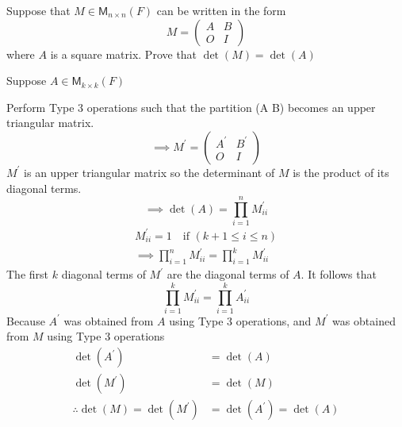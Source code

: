 Suppose that $M \in \mathsf{M}_{n\times n}(F)$ can be written in the
form 
\[
M = \begin{pmatrix} A & B\\O & I
\end{pmatrix}
\]
where $A$ is a square matrix. Prove that $\det{(M)} = \det{(A)}$

Suppose $A \in \mathsf{M}_{k\times k}(F)$

Perform Type 3 operations such that the partition (A B) becomes an
upper triangular matrix.
\begin{equation}
\implies M^\prime = \begin{pmatrix} A^\prime & B^\prime \\ O & I
\end{pmatrix}
\end{equation}
$M^\prime$ is an upper triangular matrix so the determinant of $M$ is
the product of its diagonal terms.
\begin{equation}
\implies \det{(A)} = \prod\limits_{i=1}^n M^\prime_{ii}
\end{equation}
\begin{gather}
M^\prime_{ii} = 1 \quad \text{if } (k +1 \leq i \leq n)\\
\implies \prod\limits_{i=1}^n M^\prime_{ii} = \prod\limits_{i=1}^k
M^\prime_{ii}
\end{gather}
The first $k$ diagonal terms of $M^\prime$ are the diagonal terms of
$A$. It follows that
\begin{equation}
\prod\limits_{i=1}^k M^\prime_{ii} = \prod\limits_{i=1}^k A^\prime_{ii}
\end{equation}
Because $A^\prime$ was obtained from $A$ using Type 3 operations, and
$M^\prime$ was obtained from $M$ using Type 3 operations
\begin{align}
\det{(A^\prime)} &= \det{(A)}\\
\det{(M^\prime)} &= \det{(M)}\\
\therefore \det{(M)} = \det{(M^\prime)} &= \det{(A^\prime)} = \det{(A)}
\end{align}
